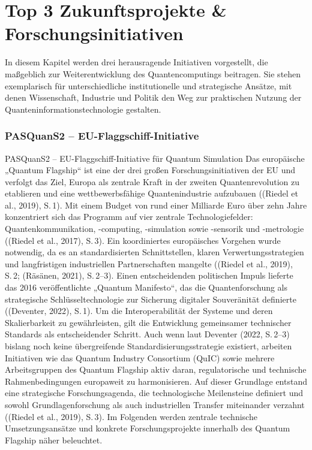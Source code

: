 \section{Top 3 Zukunftsprojekte \& Forschungsinitiativen}

In diesem Kapitel werden drei herausragende Initiativen vorgestellt, die maßgeblich zur Weiterentwicklung des Quantencomputings beitragen. Sie stehen exemplarisch für unterschiedliche institutionelle und strategische Ansätze, mit denen Wissenschaft, Industrie und Politik den Weg zur praktischen Nutzung der Quanteninformationstechnologie gestalten. 

\subsubsection*{PASQuanS2 – EU-Flaggschiff-Initiative}
PASQuanS2 – EU-Flaggschiff-Initiative für Quantum Simulation
Das europäische „Quantum Flagship“ ist eine der drei großen Forschungsinitiativen der EU und verfolgt das Ziel, Europa als zentrale Kraft in der zweiten Quantenrevolution zu etablieren und eine wettbewerbsfähige Quantenindustrie aufzubauen ((Riedel et al., 2019), S. 1). Mit einem Budget von rund einer Milliarde Euro über zehn Jahre konzentriert sich das Programm auf vier zentrale Technologiefelder: Quantenkommunikation, -computing, -simulation sowie -sensorik und -metrologie ((Riedel et al., 2017), S. 3).
Ein koordiniertes europäisches Vorgehen wurde notwendig, da es an standardisierten Schnittstellen, klaren Verwertungsstrategien und langfristigen industriellen Partnerschaften mangelte ((Riedel et al., 2019), S. 2; (Räsänen, 2021), S. 2–3). Einen entscheidenden politischen Impuls lieferte das 2016 veröffentlichte „Quantum Manifesto“, das die Quantenforschung als strategische Schlüsseltechnologie zur Sicherung digitaler Souveränität definierte ((Deventer, 2022), S. 1). Um die Interoperabilität der Systeme und deren Skalierbarkeit zu gewährleisten, gilt die Entwicklung gemeinsamer technischer Standards als entscheidender Schritt. Auch wenn laut Deventer (2022, S. 2–3) bislang noch keine übergreifende Standardisierungsstrategie existiert, arbeiten Initiativen wie das Quantum Industry Consortium (QuIC) sowie mehrere Arbeitsgruppen des Quantum Flagship aktiv daran, regulatorische und technische Rahmenbedingungen europaweit zu harmonisieren. Auf dieser Grundlage entstand eine strategische Forschungsagenda, die technologische Meilensteine definiert und sowohl Grundlagenforschung als auch industriellen Transfer miteinander verzahnt ((Riedel et al., 2019), S. 3). Im Folgenden werden zentrale technische Umsetzungsansätze und konkrete Forschungsprojekte innerhalb des Quantum Flagship näher beleuchtet.
